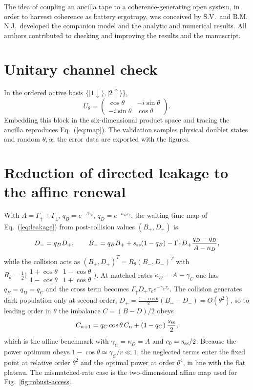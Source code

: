 \documentclass[aps,pre,twocolumn,groupedaddress,amsmath,amssymb,nofootinbib]{revtex4-2}
\newcommand{\ket}[1]{\lvert #1\rangle}
\begin{document}
\begin{acknowledgments}
The idea of coupling an ancilla tape to a coherence-generating open system,
in order to harvest coherence as battery ergotropy, was conceived by S.V.\
and B.M. N.J.\ developed the companion model and the analytic and numerical
results. All authors contributed to checking and improving the results and
the manuscript.
\end{acknowledgments}

\appendix

\section{Unitary channel check}

In the ordered active basis
$\{\ket{1\downarrow},\ket{2\uparrow}\}$,
\begin{equation}
U_\theta=
\begin{pmatrix}
\cos\theta&-i\sin\theta\\
-i\sin\theta&\cos\theta
\end{pmatrix}.
\end{equation}
Embedding this block in the six-dimensional product space and tracing the
ancilla reproduces Eq.~(\ref{eq:map}). The validation samples physical
doublet states and random $\theta,\alpha$; the error data are exported with
the figures.

\section{Reduction of directed leakage to the affine renewal}
\label{app:leakage}

With $A=\Gamma_\uparrow+\Gamma_\downarrow$, $q_B=e^{-A\tau_c}$,
$q_D=e^{-\kappa_D\tau_c}$, the waiting-time map of Eq.~(\ref{eq:leakage})
from post-collision values $(B_+,D_+)$ is
\begin{equation}
D_-=q_D D_+,\qquad
B_-=q_B B_+ + s_{\rm ss}(1-q_B)
-\Gamma_\uparrow D_+\frac{q_D-q_B}{A-\kappa_D},
\end{equation}
while the collision acts as
$(B_+,D_+)^T=R_\theta(B_-,D_-)^T$ with
$R_\theta=\tfrac12\bigl(\begin{smallmatrix}
1+\cos\theta&1-\cos\theta\\ 1-\cos\theta&1+\cos\theta
\end{smallmatrix}\bigr)$.
At matched rates $\kappa_D=A\equiv\gamma_C$ one has $q_B=q_D=q_C$ and the
cross term becomes $\Gamma_\uparrow D_+\tau_c e^{-\gamma_C\tau_c}$. The
collision generates dark population only at second order,
$D_+=\tfrac{1-\cos\theta}{2}(B_--D_-)=O(\theta^2)$, so to leading order in
$\theta$ the imbalance $C=(B-D)/2$ obeys
\begin{equation}
C_{n+1}=q_C\cos\theta\,C_n+(1-q_C)\,\frac{s_{\rm ss}}{2},
\end{equation}
which is the affine benchmark with $\gamma_C=\kappa_D=A$ and
$c_0=s_{\rm ss}/2$. Because the power optimum obeys
$1-\cos\theta\simeq\gamma_C/r\ll1$, the neglected terms enter the fixed point
at relative order $\theta^2$ and the optimal power at order $\theta^4$, in
line with the flat plateau. The mismatched-rate case is the two-dimensional
affine map used for Fig.~\ref{fig:robust-access}.
\end{document}
